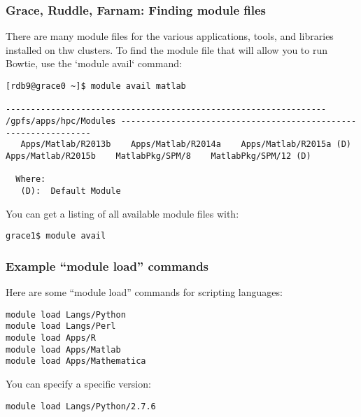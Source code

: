 \documentclass[10pt]{beamer}
\begin{document}
\begin{frame}[fragile]
\frametitle{Grace, Ruddle, Farnam: Finding module files}
There are many module files for the various applications, tools, and
libraries installed on thw clusters.  To find the module file that
will allow you to run Bowtie, use the `module avail` command:

\begin{verbatim}
[rdb9@grace0 ~]$ module avail matlab

---------------------------------------------------------------- /gpfs/apps/hpc/Modules ----------------------------------------------------------------
   Apps/Matlab/R2013b    Apps/Matlab/R2014a    Apps/Matlab/R2015a (D)    Apps/Matlab/R2015b    MatlabPkg/SPM/8    MatlabPkg/SPM/12 (D)

  Where:
   (D):  Default Module

\end{verbatim}

You can get a listing of all available module files with:
\begin{verbatim}
grace1$ module avail
\end{verbatim}
\end{frame}

\begin{frame}[fragile]
\frametitle{Example ``module load'' commands}
Here are some ``module load'' commands for scripting languages:

\begin{verbatim}
module load Langs/Python
module load Langs/Perl
module load Apps/R
module load Apps/Matlab
module load Apps/Mathematica
\end{verbatim}

You can specify a specific version:
\begin{verbatim}
module load Langs/Python/2.7.6
\end{verbatim}

\end{frame}
\end{document}
